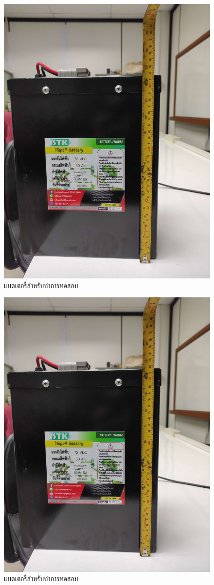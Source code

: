 \begin{center}
	\begin{figure}[H]
		\includegraphics[width=0.5\linewidth]{Chapters/img/Battery_72V_30AH}
		\centering
		\captionsetup{justification=centering,margin=2cm}
		\caption{แบตเตอรี่สำหรับทำการทดสอบ}
	\end{figure}
	\begin{figure}[H]
		\includegraphics[width=0.5\linewidth]{Chapters/img/Battery_72V_30AH}
		\centering
		\captionsetup{justification=centering,margin=2cm}
		\caption{แบตเตอรี่สำหรับทำการทดสอบ}
	\end{figure}
	\begin{figure}[H]

\end{figure}
\end{center}
